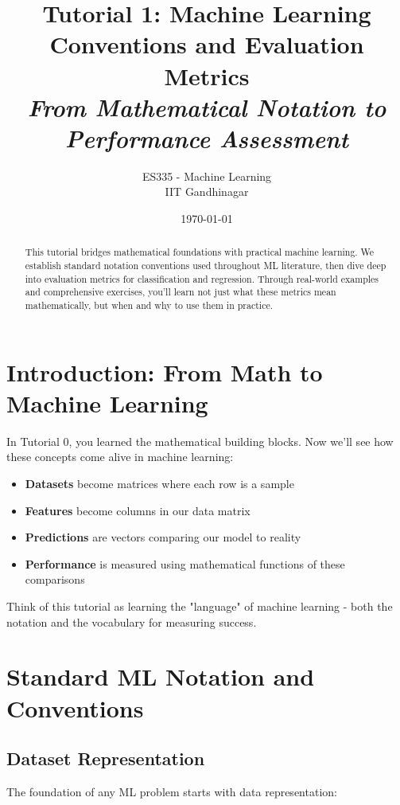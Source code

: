 \documentclass{article}
\title{\textbf{Tutorial 1: Machine Learning Conventions and Evaluation Metrics} \\ \textit{From Mathematical Notation to Performance Assessment}}
\author{ES335 - Machine Learning \\ IIT Gandhinagar}
\date{\today}
\newcounter{example}
\newcounter{exercise}
\begin{document}
\maketitle

\begin{abstract}
This tutorial bridges mathematical foundations with practical machine learning. We establish standard notation conventions used throughout ML literature, then dive deep into evaluation metrics for classification and regression. Through real-world examples and comprehensive exercises, you'll learn not just what these metrics mean mathematically, but when and why to use them in practice.
\end{abstract}

\tableofcontents
\newpage

\section{Introduction: From Math to Machine Learning}

In Tutorial 0, you learned the mathematical building blocks. Now we'll see how these concepts come alive in machine learning:

\begin{itemize}
    \item \textbf{Datasets} become matrices where each row is a sample
    \item \textbf{Features} become columns in our data matrix  
    \item \textbf{Predictions} are vectors comparing our model to reality
    \item \textbf{Performance} is measured using mathematical functions of these comparisons
\end{itemize}

Think of this tutorial as learning the "language" of machine learning - both the notation and the vocabulary for measuring success.

\section{Standard ML Notation and Conventions}

\subsection{Dataset Representation}

The foundation of any ML problem starts with data representation:
\end{document}
